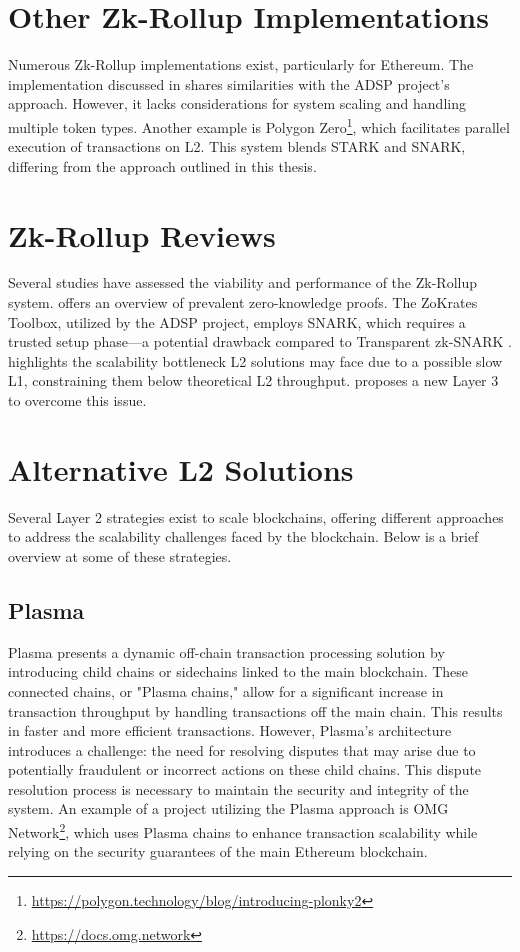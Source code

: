 \section{Other Zk-Rollup Implementations}
Numerous Zk-Rollup implementations exist, particularly for Ethereum. The implementation discussed in \cite{dinh_implementation_2023} shares similarities with the ADSP project's approach. However, it lacks considerations for system scaling and handling multiple token types. Another example is Polygon Zero\footnote{\url{https://polygon.technology/blog/introducing-plonky2}}, which facilitates parallel execution of transactions on L2. This system blends STARK and SNARK, differing from the approach outlined in this thesis.

\section{Zk-Rollup Reviews}
Several studies have assessed the viability and performance of the Zk-Rollup system. \cite{capko_state_2022} offers an overview of prevalent zero-knowledge proofs. The ZoKrates Toolbox, utilized by the ADSP project, employs SNARK, which requires a trusted setup phase—a potential drawback compared to Transparent zk-SNARK \cite{zhou_overview_2022}. \cite{neiheiser_practical_2023} highlights the scalability bottleneck L2 solutions may face due to a possible slow L1, constraining them below theoretical L2 throughput. \cite{starkware_fractal_2021} proposes a new Layer 3 to overcome this issue.

\section{Alternative L2 Solutions}
Several Layer 2 strategies exist to scale blockchains, offering different approaches to address the scalability challenges faced by the blockchain. Below is a brief overview at some of these strategies.

\subsection{Plasma}
Plasma presents a dynamic off-chain transaction processing solution by introducing child chains or sidechains linked to the main blockchain. These connected chains, or "Plasma chains," allow for a significant increase in transaction throughput by handling transactions off the main chain. This results in faster and more efficient transactions. However, Plasma's architecture introduces a challenge: the need for resolving disputes that may arise due to potentially fraudulent or incorrect actions on these child chains\cite{thibault_blockchain_2022}. This dispute resolution process is necessary to maintain the security and integrity of the system. An example of a project utilizing the Plasma approach is OMG Network\footnote{\url{https://docs.omg.network}}, which uses Plasma chains to enhance transaction scalability while relying on the security guarantees of the main Ethereum blockchain.

